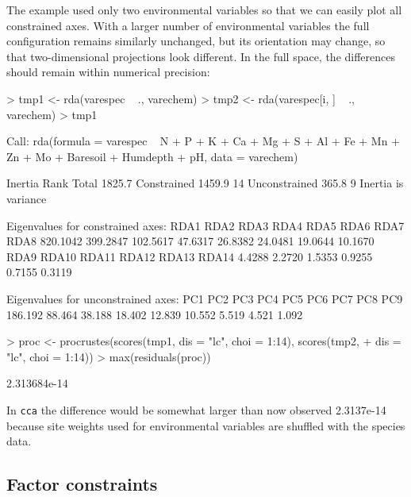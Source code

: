 \documentclass[a4paper]{article}
\begin{document}
The example used only two environmental variables so that we can
easily plot all constrained axes.  With a larger number of
environmental variables the full configuration remains similarly
unchanged, but its orientation may change, so that two-dimensional
projections look different.  In the full space, the differences should
remain within numerical precision:
\begin{Schunk}
\begin{Sinput}
> tmp1 <- rda(varespec ~ ., varechem)
> tmp2 <- rda(varespec[i, ] ~ ., varechem)
> tmp1
\end{Sinput}
\begin{Soutput}
Call:
rda(formula = varespec ~ N + P + K + Ca + Mg + S + Al + Fe +      Mn + Zn + Mo + Baresoil + Humdepth + pH, data = varechem) 

              Inertia Rank
Total          1825.7     
Constrained    1459.9   14
Unconstrained   365.8    9
Inertia is variance 

Eigenvalues for constrained axes:
    RDA1     RDA2     RDA3     RDA4     RDA5     RDA6     RDA7     RDA8 
820.1042 399.2847 102.5617  47.6317  26.8382  24.0481  19.0644  10.1670 
    RDA9    RDA10    RDA11    RDA12    RDA13    RDA14 
  4.4288   2.2720   1.5353   0.9255   0.7155   0.3119 

Eigenvalues for unconstrained axes:
    PC1     PC2     PC3     PC4     PC5     PC6     PC7     PC8     PC9 
186.192  88.464  38.188  18.402  12.839  10.552   5.519   4.521   1.092 
\end{Soutput}
\begin{Sinput}
> proc <- procrustes(scores(tmp1, dis = "lc", choi = 1:14), scores(tmp2, 
+     dis = "lc", choi = 1:14))
> max(residuals(proc))
\end{Sinput}
\begin{Soutput}
[1] 2.313684e-14
\end{Soutput}
\end{Schunk}
In \texttt{cca} the difference would be somewhat larger than now
observed 2.3137e-14 because site
weights used for environmental variables are shuffled with the species
data.

\subsection{Factor constraints}
\end{document}
